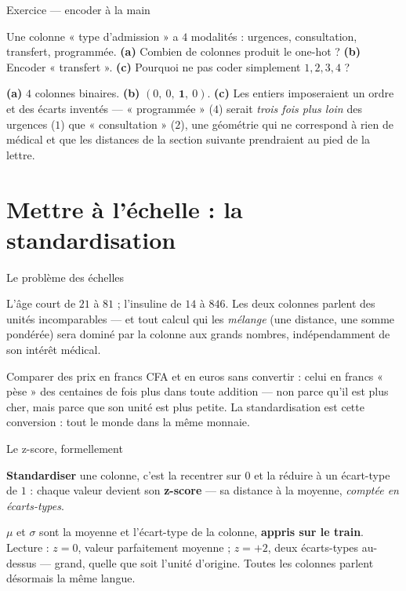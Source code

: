 \documentclass[aspectratio=169,11pt]{beamer}
\begin{document}
\begin{frame}{Exercice — encoder à la main}
\begin{ucadrec}[Énoncé]
{\small Une colonne « type d'admission » a $4$ modalités : urgences, consultation, transfert, programmée. \textbf{(a)} Combien de colonnes produit le one-hot ? \textbf{(b)} Encoder « transfert ». \textbf{(c)} Pourquoi ne pas coder simplement $1, 2, 3, 4$ ?}
\end{ucadrec}
\pause
\begin{ucadex}[Correction]
{\small \textbf{(a)} $4$ colonnes binaires. \textbf{(b)} $(0,\ 0,\ \mathbf{1},\ 0)$. \textbf{(c)} Les entiers imposeraient un ordre et des écarts inventés — « programmée » ($4$) serait \emph{trois fois plus loin} des urgences ($1$) que « consultation » ($2$), une géométrie qui ne correspond à rien de médical et que les distances de la section suivante prendraient au pied de la lettre.}
\end{ucadex}
\end{frame}

\section{Mettre à l'échelle : la standardisation}

\begin{frame}{Le problème des échelles}
\begin{ucaddef}
{\small L'âge court de $21$ à $81$ ; l'insuline de $14$ à $846$. Les deux colonnes parlent des unités incomparables — et tout calcul qui les \emph{mélange} (une distance, une somme pondérée) sera dominé par la colonne aux grands nombres, indépendamment de son intérêt médical.}
\end{ucaddef}
\begin{ucadfront}[Analogie]
{\small Comparer des prix en francs CFA et en euros sans convertir : celui en francs « pèse » des centaines de fois plus dans toute addition — non parce qu'il est plus cher, mais parce que son unité est plus petite. La standardisation est cette conversion : tout le monde dans la même monnaie.}
\end{ucadfront}
\end{frame}

\begin{frame}{Le z-score, formellement}
\begin{ucaddef}[Définition]
{\small \textbf{Standardiser} une colonne, c'est la recentrer sur $0$ et la réduire à un écart-type de $1$ : chaque valeur devient son \textbf{z-score} — sa distance à la moyenne, \emph{comptée en écarts-types}.}
\end{ucaddef}
{\small $\mu$ et $\sigma$ sont la moyenne et l'écart-type de la colonne, \textbf{appris sur le train}. Lecture : $z = 0$, valeur parfaitement moyenne ; $z = +2$, deux écarts-types au-dessus — grand, quelle que soit l'unité d'origine. Toutes les colonnes parlent désormais la même langue.}
\end{frame}
\end{document}
